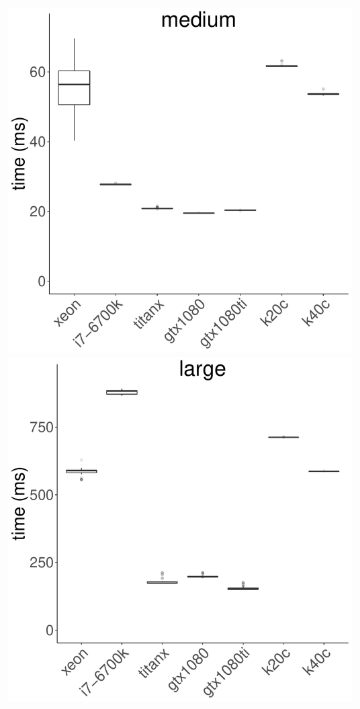 \documentclass[../document.tex]{subfiles}
\begin{document}
\begin{figure}
\begin{subfigure}{0.9\textwidth}
		\includegraphics[width=\plotwidth]{figures/time-results/generate_lud_medium_boxplot-1}
		\includegraphics[width=\plotwidth]{figures/time-results/generate_lud_large_boxplot-1}
	\end{subfigure}
	

\end{figure}
\end{document}
